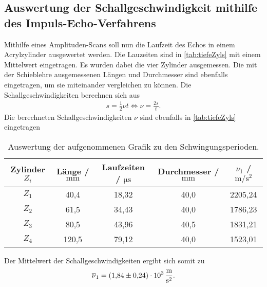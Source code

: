 \subsection{Auswertung der Schallgeschwindigkeit mithilfe des Impuls-Echo-Verfahrens}
\label{subsec:schallImpEcho}

Mithilfe eines Amplituden-Scans soll nun die Laufzeit des Echos in einem Acrylzylinder ausgewertet werden. Die Lauzeiten sind in \autoref{tab:tiefeZyls} mit einem Mittelwert eingetragen.
Es wurden dabei die vier Zylinder ausgemessen. 
Die mit der Schieblehre ausgemessenen Längen und Durchmesser sind ebenfalls eingetragen, um sie miteinander vergleichen zu können.
Die Schallgeschwindigkeiten berechnen sich aus
\begin{align}
  s = \frac 12 \nu t \iff \nu = \frac{2s}{t}.
\end{align}
Die berechneten Schallgeschwindigkeiten $\nu$ sind ebenfalls in \autoref{tab:tiefeZyls} eingetragen

\begin{table}
  \centering
  \caption{Auswertung der aufgenommenen Grafik zu den Schwingungsperioden.}
  \label{tab:tiefeZyls}
  \begin{tabular}{c c c c c}
    \toprule
    Zylinder $Z_i$ & Länge / $\si{\milli\meter}$  &  Laufzeiten / $\si{\micro\second}$ & Durchmesser / $\si{\milli\meter}$ & $\nu_1$ / $\si{\meter\per\second\squared} $\\
    \midrule
    $Z_1$ & 40,4  & 18,32 & 40,0 & 2205,24\\
    $Z_2$ & 61,5  & 34,43 & 40,0 & 1786,23 \\
    $Z_3$ & 80,5  & 43,96 & 40,5 & 1831,21 \\
    $Z_4$ & 120,5 & 79,12 & 40,0 & 1523,01 \\
    \bottomrule
  \end{tabular}
\end{table}

Der Mittelwert der Schallgeschwindigkeiten ergibt sich somit zu
\begin{align*}
  \overline \nu_1 = \SI{1.84 \pm 0,24 e3}{\meter\per\second\squared}.
\end{align*}

